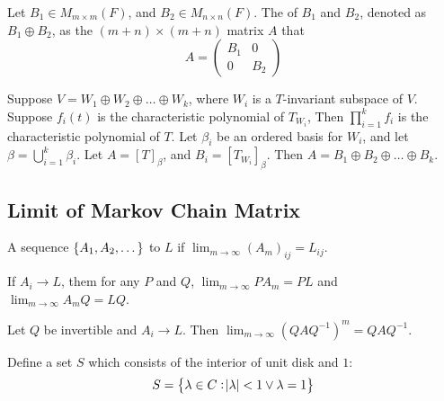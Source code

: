 \begin{definition}
    Let $B_1 \in M_{m \times m}(F)$, and $B_2 \in M_{n \times n} (F)$. The  of $B_1$ and $B_2$, denoted as $B_1 \oplus B_2$, as the $(m+n) \times (m+n)$ matrix $A$ that
    \begin{equation*}
        A = \begin{pmatrix}
            B_1 & 0 \\
            0 & B_2
        \end{pmatrix}
    \end{equation*}
\end{definition}


\begin{theorem}
    Suppose $V=W_1 \oplus W_2 \oplus \dots \oplus W_k$, where $W_i$ is a $T$-invariant subspace of $V$. Suppose $f_i(t)$ is the characteristic polynomial of $T_{W_i}$, Then $\displaystyle \prod_{i=1}^k f_i$ is the characteristic polynomial of $T$. Let $\beta_i$ be an ordered basis for $W_i$, and let $\displaystyle \beta = \bigcup_{i=1}^k \beta_i$. Let $A=[T]_\beta$, and $B_i=[T_{W_i}]_\beta$. Then $A = B_1 \oplus B_2 \oplus \dots \oplus B_k$.
\end{theorem}



\subsection{Limit of Markov Chain Matrix}

\begin{definition}
    A sequence $\set{A_1, A_2, \dots}$  to  $L$ if $\displaystyle \lim_{m \rightarrow \infty} (A_m)_{ij} = L_{ij}$.
\end{definition}

\begin{theorem}
    If $A_i \rightarrow L$, them for any $P$ and $Q$, $\displaystyle \lim_{m \rightarrow \infty} P A_m = PL$ and $\displaystyle \lim_{m \rightarrow \infty} A_m Q = LQ$.
\end{theorem}

\begin{theorem}
    Let $Q$ be invertible and $A_i \rightarrow L$. Then $\displaystyle \lim_{m \rightarrow \infty} (Q A Q^{-1})^m = Q A Q^{-1}$.
\end{theorem}

\begin{definition}
    Define a set $S$ which consists of the interior of unit disk and $1$:
    \begin{equation}
        S = \set{\lambda \in C :  \abs{\lambda} < 1   \vee \lambda = 1}
    \end{equation}
\end{definition}


